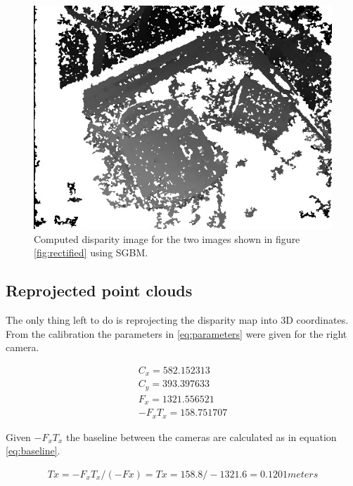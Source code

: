 \begin{figure}[h!]
   \centering
    \includegraphics[scale=0.4]{graphics/06_vision/disparity_example.jpg}
    \caption{Computed disparity image for the two images shown in figure \ref{fig:rectified} using SGBM. }
    \label{fig:disparity}
\end{figure}


\subsection{Reprojected point clouds} \label{sec:repro_point}

The only thing left to do is reprojecting the disparity map into 3D coordinates. From the calibration the parameters in \ref{eq:parameters} were given for the right camera.

\begin{equation}\label{eq:parameters}
\begin{split}
C_{x} = 582.152313 \\
C_{y} = 393.397633 \\
F_{x} = 1321.556521 \\
-F_{x}T_{x} = 158.751707 
\end{split}
\end{equation} 

Given $ -F_{x}T_{x} $ the baseline between the cameras are calculated as in equation \ref{eq:baseline}.

\begin{equation}\label{eq:baseline}
\begin{split}
Tx = -F_{x}T_{x}/(-Fx) = Tx = 158.8/-1321.6 = 0.1201 meters
\end{split}
\end{equation} 

